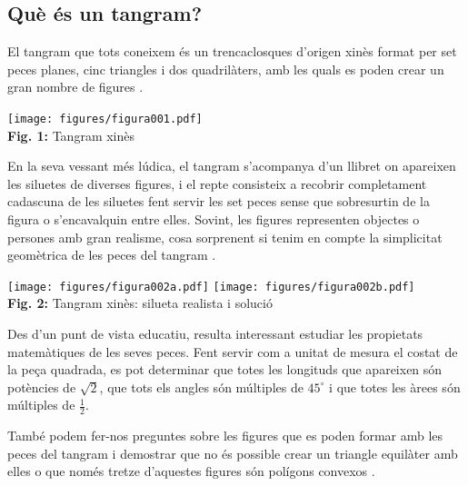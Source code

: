 \documentclass[a4paper,11pt]{article}
\begin{document}
    \bigskip


    \begin{multicols}{2}

        \section{Què és un tangram?}

            El tangram que tots coneixem és un trencaclosques d'origen xinès format per set peces planes, cinc triangles i dos quadrilàters, amb les quals es poden crear un gran nombre de figures \cite{gardner1988time}.

            \begin{center}
                \texttt{[image: figures/figura001.pdf]} \\
                \footnotesize{\textbf{Fig. 1:} Tangram xinès}
            \end{center}

            En la seva vessant més lúdica, el tangram s'acompanya d'un llibret on apareixen les siluetes de diverses figures, i el repte consisteix a recobrir completament cadascuna de les siluetes fent servir les set peces sense que sobresurtin de la figura o s'encavalquin entre elles. Sovint, les figures representen objectes o persones amb gran realisme, cosa sorprenent si tenim en compte la simplicitat geomètrica de les peces del tangram \cite{loyd2007sam}.

            \begin{center}
                \texttt{[image: figures/figura002a.pdf]} \texttt{[image: figures/figura002b.pdf]} \\
                \footnotesize{\textbf{Fig. 2:} Tangram xinès: silueta realista i solució}
            \end{center}

            Des d'un punt de vista educatiu, resulta interessant estudiar les propietats matemàtiques de les seves peces. Fent servir com a unitat de mesura el costat de la peça quadrada, es pot determinar que totes les longituds que apareixen són potències de $\sqrt{2}$, que tots els angles són múltiples de $45^\circ$ i que totes les àrees són múltiples de $\tfrac{1}{2}$.

            També podem fer-nos preguntes sobre les figures que es poden formar amb les peces del tangram i demostrar que no és possible crear un triangle equilàter amb elles o que només tretze d'aquestes figures són polígons convexos \cite{hsiung2001selected}.


\end{multicols}
\end{document}
